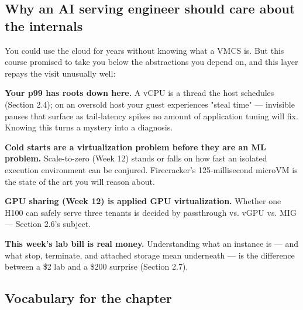 \subsection*{Why an AI serving engineer should care about the internals}

You could use the cloud for years without knowing what a VMCS is. But this course promised to take you below the abstractions you depend on, and this layer repays the visit unusually well:

\begin{tbbitemize}
  \item \textbf{Your p99 has roots down here.} A vCPU is a thread the host schedules (Section 2.4); on an oversold host your guest experiences "steal time" — invisible pauses that surface as tail-latency spikes no amount of application tuning will fix. Knowing this turns a mystery into a diagnosis.
  \item \textbf{Cold starts are a virtualization problem before they are an ML problem.} Scale-to-zero (Week 12) stands or falls on how fast an isolated execution environment can be conjured. Firecracker's 125-millisecond microVM is the state of the art you will reason about.
  \item \textbf{GPU sharing (Week 12) is applied GPU virtualization.} Whether one H100 can safely serve three tenants is decided by passthrough vs. vGPU vs. MIG — Section 2.6's subject.
  \item \textbf{This week's lab bill is real money.} Understanding what an instance is — and what stop, terminate, and attached storage mean underneath — is the difference between a \$2 lab and a \$200 surprise (Section 2.7).
\end{tbbitemize}

\subsection*{Vocabulary for the chapter}

